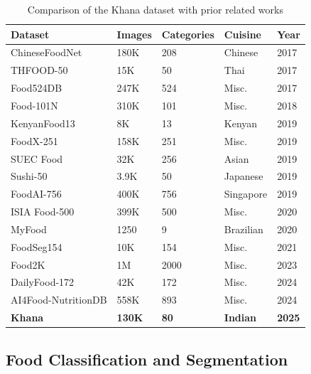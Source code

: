 \documentclass{article}
\begin{document}
\begin{table}
  \centering
  \renewcommand{\arraystretch}{1.25}
  \begin{tabular}{lllll}
    \hline
    \textbf{Dataset} & \textbf{Images} & \textbf{Categories} & \textbf{Cuisine} & \textbf{Year} \\
    \hline
    ChineseFoodNet \nocite{arxiv.1705.02743} & 180K & 208 & Chinese & 2017 \\
    THFOOD-50 \nocite{Termritthikun2017} & 15K & 50 & Thai & 2017 \\
    Food524DB \nocite{Ciocca2017} & 247K & 524 & Misc. & 2017 \\
    Food-101N \nocite{Lee2018} & 310K & 101 & Misc. & 2018 \\
    KenyanFood13 \nocite{Jalal2019} & 8K & 13 & Kenyan & 2019 \\
    FoodX-251 \nocite{arxiv.1907.06167} & 158K & 251 & Misc. & 2019 \\
    SUEC Food \nocite{arxiv.1903.07437} & 32K & 256 & Asian & 2019 \\
    Sushi-50 \nocite{Jianing2019} & 3.9K & 50 & Japanese & 2019 \\
    FoodAI-756 \nocite{Sahoo2019} & 400K & 756 & Singapore & 2019 \\
    ISIA Food-500 \nocite{Min2020} & 399K & 500 & Misc. & 2020 \\
    MyFood \nocite{arxiv.2012.03087} & 1250 & 9 & Brazilian & 2020 \\
    FoodSeg154 \nocite{Wu2021} & 10K & 154 & Misc. & 2021 \\
    Food2K \nocite{Min2023} & 1M & 2000 & Misc. & 2023 \\ 
    DailyFood-172 \nocite{Liu2024} & 42K & 172 & Misc. & 2024 \\
    AI4Food-NutritionDB \nocite{RomeroTapiador2024} & 558K & 893 & Misc. & 2024 \\\hline
    \textbf{Khana} & \textbf{130K} & \textbf{80} & \textbf{Indian} & \textbf{2025} \\\hline
  \end{tabular}
  \caption{Comparison of the Khana dataset with prior related works}
  \label{tab:comparison-datasets}
\end{table}

\subsection{Food Classification and Segmentation}
\label{subsec:related-class-seg}
\end{document}
